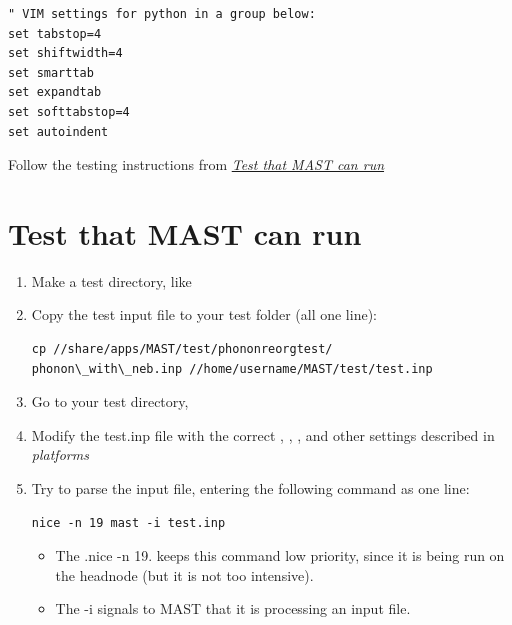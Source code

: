 \documentclass[letterpaper,10pt,english]{sphinxmanual}
\begin{document}
\begin{Verbatim}[commandchars=\\\{\}]
" VIM settings for python in a group below:
set tabstop=4
set shiftwidth=4
set smarttab
set expandtab
set softtabstop=4
set autoindent
\end{Verbatim}

Follow the testing instructions from {\hyperref[1_0_installation:test-on-cluster]{\emph{Test that MAST can run}}}


\section{Test that MAST can run}
\label{1_0_installation:test-that-mast-can-run}\label{1_0_installation:test-on-cluster}\begin{enumerate}
\item {} 
Make a test directory, like 

\item {} 
Copy the test input file to your test folder (all one line):

\begin{Verbatim}[commandchars=\\\{\}]
cp //share/apps/MAST/test/phononreorgtest/
phonon\_with\_neb.inp //home/username/MAST/test/test.inp
\end{Verbatim}

\item {} 
Go to your test directory, 

\item {} 
Modify the test.inp file with the correct , , , and other settings described in \emph{platforms}

\item {} 
Try to parse the input file, entering the following command as one line:

\begin{Verbatim}[commandchars=\\\{\}]
nice -n 19 mast -i test.inp
\end{Verbatim}
\begin{itemize}
\item {} 
The .nice -n 19. keeps this command low priority, since it is being run on the headnode (but it is not too intensive).

\item {} 
The -i signals to MAST that it is processing an input file.


\end{itemize}
\end{enumerate}
\end{document}
